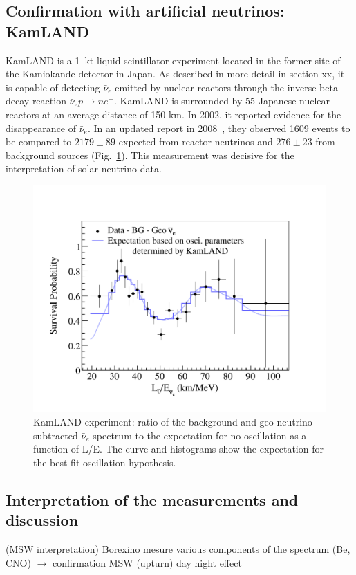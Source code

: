 \subsection{Confirmation with artificial neutrinos: KamLAND}

KamLAND is a 1~kt liquid scintillator experiment located in the former site of the Kamiokande detector in Japan. As described in more detail in section xx, it is capable of detecting $\bar \nu_e$ emitted by nuclear reactors through the inverse beta decay reaction $\bar{\nu}_e p \rightarrow n e^+$. KamLAND is surrounded by 55 Japanese nuclear reactors at an average distance of 150 km. In 2002, it reported  evidence for the disappearance  of $\bar \nu_e$. In an updated report in 2008~\cite{kamland}, they observed 1609 
events to be compared to $2179 \pm 89$ expected from reactor neutrinos and  $276 \pm 23$ from background sources (Fig.~\ref{fig:sol-kam}). This measurement was decisive for the interpretation of solar neutrino data.

\begin{figure}[htbp]
\centering
\includegraphics[width=0.6\linewidth]{figures/LE.pdf}
  \caption{KamLAND experiment: ratio of the background and geo-neutrino-subtracted $\bar{\nu}_e$
spectrum to the expectation for no-oscillation as a function of
L/E. The curve and histograms show the expectation for the best fit oscillation hypothesis.}
 \label{fig:sol-kam}
 \end{figure}



\subsection{Interpretation of the measurements and discussion}
\label{subsec:solarinter}
(MSW interpretation) Borexino  mesure various components of the spectrum (Be, CNO) $\rightarrow$ confirmation MSW (upturn) day night effect


